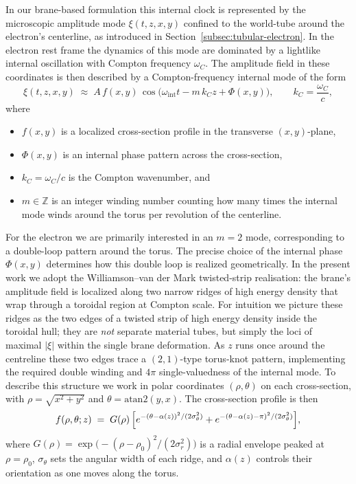 In our brane-based formulation this internal clock is represented by
the microscopic amplitude mode $\xi(t,z,x,y)$ confined to the
world-tube around the electron's centerline, as introduced in
Section~\ref{subsec:tubular-electron}. In the electron rest frame the
dynamics of this mode are dominated by a lightlike internal oscillation
with Compton frequency $\omega_C$. The amplitude field in these coordinates
is then described by a Compton-frequency internal mode of the form
%
\begin{equation}
  \xi(t,z,x,y)
  \;\approx\;
  A\,f(x,y)\,
  \cos\!\bigl(\omega_{\text{int}} t - m\,k_C z + \Phi(x,y)\bigr),
  \qquad
  k_C = \frac{\omega_C}{c},
  \label{eq:xi-rest-compton-mode}
\end{equation}
%
where
\begin{itemize}
  \item $f(x,y)$ is a localized cross-section profile in the transverse
  $(x,y)$-plane,
  \item $\Phi(x,y)$ is an internal phase pattern across the
  cross-section,
  \item $k_C = \omega_C/c$ is the Compton wavenumber, and
  \item $m\in\mathbb{Z}$ is an integer winding number counting how many
  times the internal mode winds around the torus per revolution of the
  centerline.
\end{itemize}
For the electron we are primarily interested in an $m=2$ mode,
corresponding to a double-loop pattern around the torus. The precise
choice of the internal phase $\Phi(x,y)$ determines how this double loop is realized geometrically.
In the present work we adopt the Williamson--van der Mark twisted-strip
realisation: the brane's amplitude field is localized along two narrow
ridges of high energy density that wrap through a toroidal region at
Compton scale. For intuition we picture these ridges as the two edges of
a twisted strip of high energy density inside the toroidal hull; they
are \emph{not} separate material tubes, but simply the loci of maximal
$|\xi|$ within the single brane deformation. As $z$ runs once around the
centreline these two edges trace a $(2,1)$-type torus-knot pattern,
implementing the required double winding and $4\pi$ single-valuedness of
the internal mode. To describe this structure
we work in polar coordinates $(\rho,\theta)$ on each cross-section, with
$\rho = \sqrt{x^2+y^2}$ and $\theta = \mathrm{atan2}(y,x)$. The
cross-section profile is then
%
\begin{equation}
  f(\rho,\theta;z)
  \;=\;
  G(\rho)\,\Bigl[
    e^{-(\theta-\alpha(z))^2/(2\sigma_\theta^2)}
    +
    e^{-(\theta-\alpha(z)-\pi)^2/(2\sigma_\theta^2)}
  \Bigr],
  \label{eq:double-tunnel-profile}
\end{equation}
%
where $G(\rho) = \exp\bigl(-(\rho-\rho_0)^2/(2\sigma_r^2)\bigr)$ is a
radial envelope peaked at $\rho=\rho_0$, $\sigma_\theta$ sets the angular
width of each ridge, and $\alpha(z)$ controls their orientation as one
moves along the torus.

